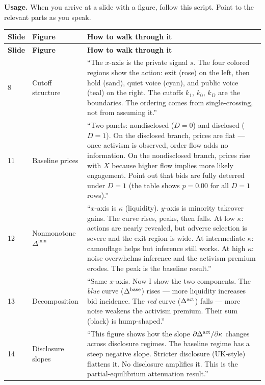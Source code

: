 \documentclass[9pt,a4paper]{extarticle}
\begin{document}
\textbf{Usage.} When you arrive at a slide with a figure, follow this script. Point to the relevant parts as you speak.

{\footnotesize
\begin{longtable}{@{}P{0.11\textwidth}P{0.18\textwidth}P{0.65\textwidth}@{}}
\toprule
\textbf{Slide} & \textbf{Figure} & \textbf{How to walk through it} \\
\midrule
\endfirsthead
\toprule
\textbf{Slide} & \textbf{Figure} & \textbf{How to walk through it} \\
\midrule
\endhead

8 & Cutoff structure &
``The $x$-axis is the private signal $s$. The four colored regions show the action: exit (rose) on the left, then hold (sand), quiet voice (cyan), and public voice (teal) on the right. The cutoffs $k_1$, $k_0$, $k_D$ are the boundaries. The ordering comes from single-crossing, not from assuming it.'' \\

11 & Baseline prices &
``Two panels: nondisclosed ($D=0$) and disclosed ($D=1$). On the disclosed branch, prices are flat --- once activism is observed, order flow adds no information. On the nondisclosed branch, prices rise with $X$ because higher flow implies more likely engagement. Point out that bids are fully deterred under $D=1$ (the table shows $p=0.00$ for all $D=1$ rows).'' \\

12 & Nonmonotone $\Delta^{\min}$ &
``$x$-axis is $\kappa$ (liquidity). $y$-axis is minority takeover gains. The curve rises, peaks, then falls. At low $\kappa$: actions are nearly revealed, but adverse selection is severe and the exit region is wide. At intermediate $\kappa$: camouflage helps but inference still works. At high $\kappa$: noise overwhelms inference and the activism premium erodes. The peak is the baseline result.'' \\

13 & Decomposition &
``Same $x$-axis. Now I show the two components. The \emph{blue} curve ($\Delta^{\textup{base}}$) rises --- more liquidity increases bid incidence. The \emph{red} curve ($\Delta^{\textup{act}}$) falls --- more noise weakens the activism premium. Their sum (black) is hump-shaped.'' \\

14 & Disclosure slopes &
``This figure shows how the slope $\partial\Delta^{\textup{act}}/\partial\kappa$ changes across disclosure regimes. The baseline regime has a steep negative slope. Stricter disclosure (UK-style) flattens it. No disclosure amplifies it. This is the partial-equilibrium attenuation result.'' \\
\bottomrule
\end{longtable}
}
\end{document}
